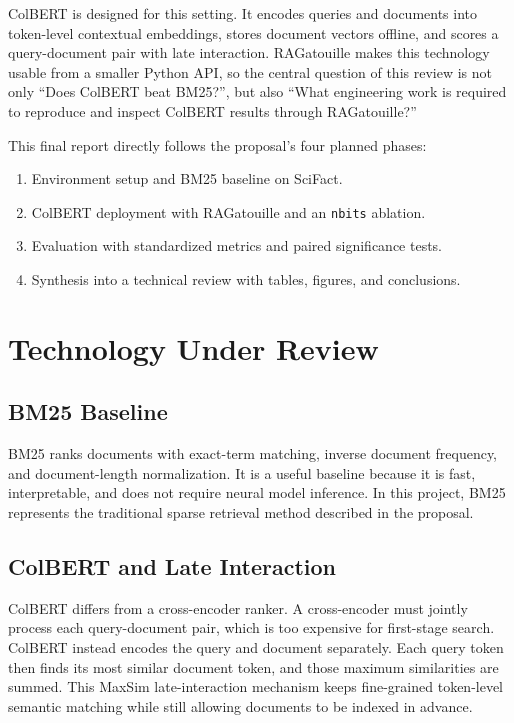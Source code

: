 \documentclass[sigconf,nonacm]{acmart}
\begin{document}
ColBERT is designed for this setting. It encodes queries and documents into
token-level contextual embeddings, stores document vectors offline, and scores a
query-document pair with late interaction. RAGatouille makes this technology
usable from a smaller Python API, so the central question of this review is not
only ``Does ColBERT beat BM25?'', but also ``What engineering work is required
to reproduce and inspect ColBERT results through RAGatouille?''

This final report directly follows the proposal's four planned phases:

\begin{enumerate}
  \item Environment setup and BM25 baseline on SciFact.
  \item ColBERT deployment with RAGatouille and an \texttt{nbits} ablation.
  \item Evaluation with standardized metrics and paired significance tests.
  \item Synthesis into a technical review with tables, figures, and conclusions.
\end{enumerate}

\section{Technology Under Review}

\subsection{BM25 Baseline}

BM25 ranks documents with exact-term matching, inverse document frequency, and
document-length normalization. It is a useful baseline because it is fast,
interpretable, and does not require neural model inference. In this project,
BM25 represents the traditional sparse retrieval method described in the
proposal.

\subsection{ColBERT and Late Interaction}

ColBERT differs from a cross-encoder ranker. A cross-encoder must jointly
process each query-document pair, which is too expensive for first-stage search.
ColBERT instead encodes the query and document separately. Each query token then
finds its most similar document token, and those maximum similarities are
summed. This MaxSim late-interaction mechanism keeps fine-grained token-level
semantic matching while still allowing documents to be indexed in advance.
\end{document}
